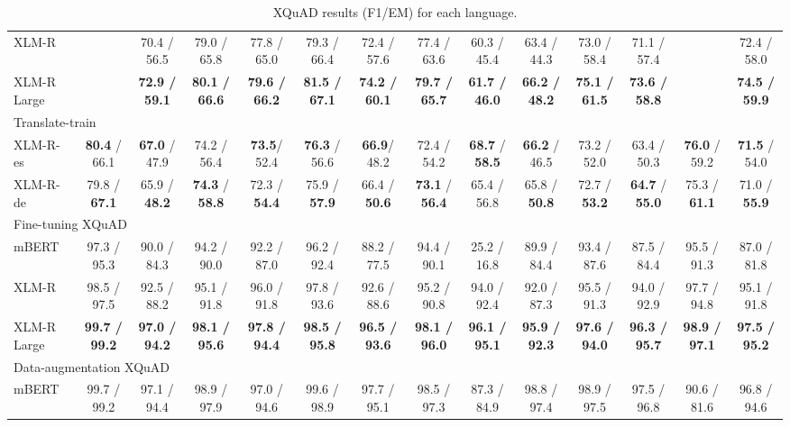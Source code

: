 \documentclass[11pt]{article}
\begin{document}
\begin{table*}[!ht]
\begin{adjustbox}{max width=\textwidth}
\begin{tabular}{l|cccccccccccc|c}
        XLM-R & ~ & 70.4 / 56.5 & 79.0 / 65.8 & 77.8 / 65.0 & 79.3 / 66.4 & 72.4 / 57.6 & 77.4 / 63.6 & 60.3 / 45.4 & 63.4 / 44.3 & 73.0 / 58.4 & 71.1 / 57.4 & ~ & 72.4 / 58.0 \\
        XLM-R Large & ~ &\textbf{72.9 / 59.1}&\textbf{80.1 / 66.6}&\textbf{79.6 / 66.2}&\textbf{81.5 / 67.1}&\textbf{74.2 / 60.1}&\textbf{79.7 / 65.7}&\textbf{61.7 / 46.0}&\textbf{66.2 / 48.2}&\textbf{75.1 / 61.5}&\textbf{73.6 / 58.8}& ~ &\textbf{74.5 / 59.9}\\
        \midrule
        \multicolumn{14}{l}{Translate-train} \\
        \midrule
        XLM-R-es &\textbf{80.4} / 66.1 &\textbf{67.0} / 47.9 & 74.2 / 56.4 &\textbf{73.5}/ 52.4 &\textbf{76.3} / 56.6 &\textbf{66.9}/ 48.2 & 72.4 / 54.2 &\textbf{68.7} / \textbf{58.5} & \textbf{66.2} / 46.5 & 73.2 / 52.0 & 63.4 / 50.3 &\textbf{76.0} / 59.2 &\textbf{71.5} / 54.0 \\
        XLM-R-de & 79.8 / \textbf{67.1}& 65.9 / \textbf{48.2}&\textbf{74.3} / \textbf{58.8}& 72.3 / \textbf{54.4}& 75.9 / \textbf{57.9}& 66.4 / \textbf{50.6}&\textbf{73.1} / \textbf{56.4}& 65.4 / 56.8 & 65.8 / \textbf{50.8}& 72.7 / \textbf{53.2}& \textbf{64.7} / \textbf{55.0}& 75.3 / \textbf{61.1}& 71.0 / \textbf{55.9}\\
        \midrule
        \multicolumn{14}{l}{Fine-tuning XQuAD} \\
        \midrule
        mBERT & 97.3 / 95.3 & 90.0 / 84.3 & 94.2 / 90.0 & 92.2 / 87.0 & 96.2 / 92.4 & 88.2 / 77.5 & 94.4 / 90.1 & 25.2 / 16.8 & 89.9 / 84.4 & 93.4 / 87.6 & 87.5 / 84.4 & 95.5 / 91.3 & 87.0 / 81.8 \\
        XLM-R & 98.5 / 97.5 & 92.5 / 88.2 & 95.1 / 91.8 & 96.0 / 91.8 & 97.8 / 93.6 & 92.6 / 88.6 & 95.2 / 90.8 & 94.0 / 92.4 & 92.0 / 87.3 & 95.5 / 91.3 & 94.0 / 92.9 & 97.7 / 94.8 & 95.1 / 91.8 \\
        XLM-R Large &\textbf{99.7 / 99.2}&\textbf{97.0 / 94.2}&\textbf{98.1 / 95.6}&\textbf{97.8 / 94.4}&\textbf{98.5 / 95.8}&\textbf{96.5 / 93.6}&\textbf{98.1 / 96.0}&\textbf{96.1 / 95.1}&\textbf{95.9 / 92.3}&\textbf{97.6 / 94.0}&\textbf{96.3 / 95.7}&\textbf{98.9 / 97.1}&\textbf{97.5 / 95.2}\\
        \midrule
        \multicolumn{14}{l}{Data-augmentation XQuAD} \\
        \midrule
        mBERT & 99.7 / 99.2 & 97.1 / 94.4 & 98.9 / 97.9 & 97.0 / 94.6 & 99.6 / 98.9 & 97.7 / 95.1 & 98.5 / 97.3 & 87.3 / 84.9 & 98.8 / 97.4 & 98.9 / 97.5 & 97.5 / 96.8 & 90.6 / 81.6 & 96.8 / 94.6 \\
        \bottomrule
    \end{tabular}
    \end{adjustbox}
    \centering
    \caption{XQuAD results (F1/EM) for each language.}
    \label{XQuAD_results}
\end{table*}
\end{document}
